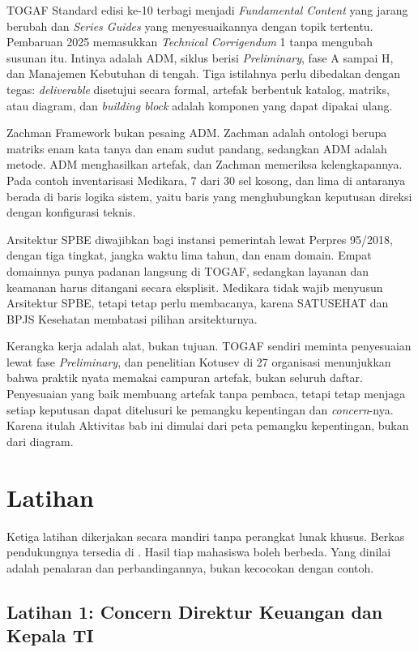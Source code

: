 TOGAF Standard edisi ke-10 terbagi menjadi \textit{Fundamental Content} yang
jarang berubah dan \textit{Series Guides} yang menyesuaikannya dengan topik
tertentu. Pembaruan 2025 memasukkan \textit{Technical Corrigendum} 1 tanpa
mengubah susunan itu. Intinya adalah ADM, siklus berisi \textit{Preliminary},
fase A sampai H, dan Manajemen Kebutuhan di tengah. Tiga istilahnya perlu
dibedakan dengan tegas: \textit{deliverable} disetujui secara formal, artefak
berbentuk katalog, matriks, atau diagram, dan \textit{building block} adalah
komponen yang dapat dipakai ulang.

Zachman Framework bukan pesaing ADM. Zachman adalah ontologi berupa matriks
enam kata tanya dan enam sudut pandang, sedangkan ADM adalah metode. ADM
menghasilkan artefak, dan Zachman memeriksa kelengkapannya. Pada contoh
inventarisasi Medikara, 7 dari 30 sel kosong, dan lima di antaranya berada di
baris logika sistem, yaitu baris yang menghubungkan keputusan direksi dengan
konfigurasi teknis.

Arsitektur SPBE diwajibkan bagi instansi pemerintah lewat Perpres 95/2018,
dengan tiga tingkat, jangka waktu lima tahun, dan enam domain. Empat
domainnya punya padanan langsung di TOGAF, sedangkan layanan dan keamanan
harus ditangani secara eksplisit. Medikara tidak wajib menyusun Arsitektur
SPBE, tetapi tetap perlu membacanya, karena SATUSEHAT dan BPJS Kesehatan
membatasi pilihan arsitekturnya.

Kerangka kerja adalah alat, bukan tujuan. TOGAF sendiri meminta penyesuaian
lewat fase \textit{Preliminary}, dan penelitian Kotusev di 27 organisasi
menunjukkan bahwa praktik nyata memakai campuran artefak, bukan seluruh
daftar. Penyesuaian yang baik membuang artefak tanpa pembaca, tetapi tetap
menjaga setiap keputusan dapat ditelusuri ke pemangku kepentingan dan
\textit{concern}-nya. Karena itulah Aktivitas bab ini dimulai dari peta
pemangku kepentingan, bukan dari diagram.

\section{Latihan}

Ketiga latihan dikerjakan secara mandiri tanpa perangkat lunak khusus.
Berkas pendukungnya tersedia di . Hasil tiap
mahasiswa boleh berbeda. Yang dinilai adalah penalaran dan perbandingannya,
bukan kecocokan dengan contoh.

\subsection*{Latihan 1: Concern Direktur Keuangan dan Kepala TI}

